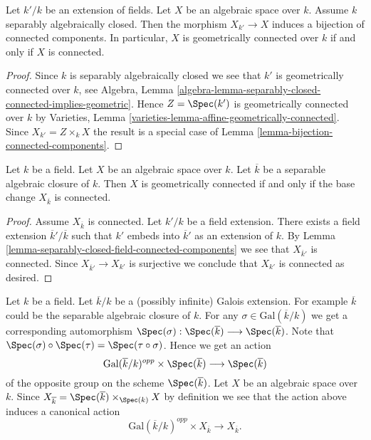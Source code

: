 \begin{lemma}
\label{lemma-separably-closed-field-connected-components}
Let $k'/k$ be an extension of fields. Let $X$ be an algebraic space
over $k$. Assume $k$ separably algebraically closed. Then the morphism
$X_{k'} \to X$ induces a bijection of connected components. In particular,
$X$ is geometrically connected over $k$ if and only if $X$ is connected.
\end{lemma}

\begin{proof}
Since $k$ is separably algebraically closed we see that
$k'$ is geometrically connected over $k$, see
Algebra,
Lemma \ref{algebra-lemma-separably-closed-connected-implies-geometric}.
Hence $Z = \Spec(k')$ is geometrically connected over $k$ by
Varieties, Lemma \ref{varieties-lemma-affine-geometrically-connected}.
Since $X_{k'} = Z \times_k X$ the result is a special case of
Lemma \ref{lemma-bijection-connected-components}.
\end{proof}

\begin{lemma}
\label{lemma-characterize-geometrically-connected}
Let $k$ be a field. Let $X$ be an algebraic space over $k$.
Let $\overline{k}$ be a separable algebraic closure of $k$.
Then $X$ is geometrically connected if and only if the base change
$X_{\overline{k}}$ is connected.
\end{lemma}

\begin{proof}
Assume $X_{\overline{k}}$ is connected. Let $k'/k$ be a field
extension. There exists a field extension $\overline{k}'/\overline{k}$
such that $k'$ embeds into $\overline{k}'$ as an extension of $k$.
By Lemma \ref{lemma-separably-closed-field-connected-components}
we see that $X_{\overline{k}'}$ is connected.
Since $X_{\overline{k}'} \to X_{k'}$ is surjective we conclude
that $X_{k'}$ is connected as desired.
\end{proof}

\noindent
Let $k$ be a field. Let $\overline{k}/k$ be a (possibly infinite)
Galois extension. For example $\overline{k}$ could be the
separable algebraic closure of $k$.
For any $\sigma \in \text{Gal}(\overline{k}/k)$ we get a corresponding
automorphism
$
\Spec(\sigma) :
\Spec(\overline{k})
\longrightarrow
\Spec(\overline{k})
$.
Note that
$\Spec(\sigma) \circ \Spec(\tau) = \Spec(\tau \circ \sigma)$.
Hence we get an action
$$
\text{Gal}(\overline{k}/k)^{opp} \times \Spec(\overline{k})
\longrightarrow
\Spec(\overline{k})
$$
of the opposite group on the scheme $\Spec(\overline{k})$.
Let $X$ be an algebraic space over $k$. Since
$X_{\overline{k}} =
\Spec(\overline{k}) \times_{\Spec(k)} X$
by definition we see that the action above induces a canonical action
\begin{equation}
\label{equation-galois-action-base-change-kbar}
\text{Gal}(\overline{k}/k)^{opp} \times X_{\overline{k}}
\longrightarrow
X_{\overline{k}}.
\end{equation}

